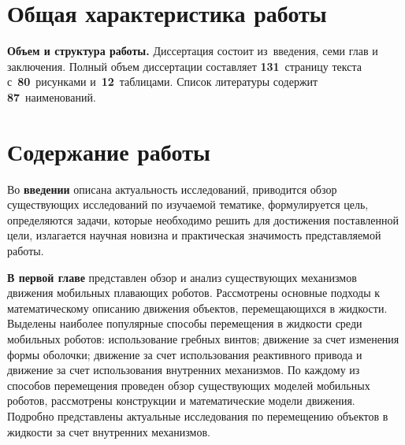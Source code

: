 \section*{Общая характеристика работы}

\newcommand{\actuality}{{\textbf{\actualityTXT}}}
\newcommand{\progress}{{\textbf{\progressTXT}}}
\newcommand{\aim}{{{\textbf\aimTXT}}}
\newcommand{\tasks}{{\textbf{\tasksTXT}}}
\newcommand{\novelty}{{\textbf{\noveltyTXT}}}
\newcommand{\influence}{{\textbf{\influenceTXT}}}
\newcommand{\methods}{{\textbf{\methodsTXT}}}
\newcommand{\defpositions}{{\textbf{\defpositionsTXT}}}
\newcommand{\reliability}{{\textbf{\reliabilityTXT}}}
\newcommand{\probation}{{\textbf{\probationTXT}}}
\newcommand{\contribution}{{\textbf{\contributionTXT}}}
\newcommand{\publications}{{\textbf{\publicationsTXT}}}




{\textbf{Объем и структура работы.}} Диссертация состоит из~введения,
семи глав и заключения. Полный объем диссертации составляет
\textbf{131}~страницу текста с~\textbf{80}~рисунками и~\textbf{12}~таблицами. Список
литературы содержит \textbf{87}~наименований.



\section*{Содержание работы}
Во {\textbf{введении}} описана актуальность исследований, приводится обзор существующих исследований по изучаемой тематике, формулируется цель, определяются задачи, которые необходимо решить для достижения поставленной цели, излагается научная новизна и практическая значимость представляемой работы.


{\textbf{В первой главе}} представлен обзор и анализ существующих механизмов движения мобильных плавающих роботов. Рассмотрены основные подходы к математическому описанию движения объектов, перемещающихся в жидкости. Выделены наиболее популярные способы перемещения в жидкости среди мобильных роботов: использование гребных винтов; движение за счет изменения формы оболочки; движение за счет использования реактивного привода и движение за счет использования внутренних механизмов. По каждому из способов перемещения проведен обзор существующих моделей мобильных роботов, рассмотрены конструкции и математические модели движения. Подробно представлены актуальные исследования по перемещению объектов в жидкости за счет внутренних механизмов. %

